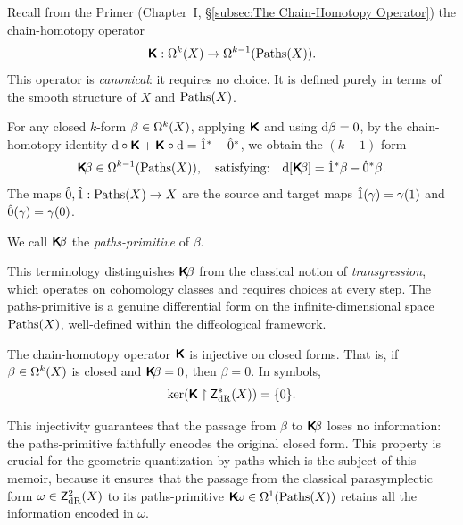 \documentclass[10pt,reqno,letterpaper,twoside]{amsbook}
\begin{document}
  \begin{article}
    \label{art:paths-primitives}
    Recall from the Primer (Chapter~I, \S\ref{subsec:The Chain-Homotopy Operator})
    the chain-homotopy operator
    \[
      \boldsymbol{\mathsf{K}}: \Omega^k(X) \to \Omega^{k-1}(\operatorname{Paths}(X)).
      \]%
    This operator is \emph{canonical}:
    it requires no choice.
    It is defined purely in terms of the smooth structure of $X$ and $\operatorname{Paths}(X)$.
    
    For any closed $k$-form $\beta \in \Omega^k(X)$,
    applying $\boldsymbol{\mathsf{K}}$ and using $\mathrm{d}\beta = 0$,
    by the chain-homotopy identity $\mathrm{d} \circ \boldsymbol{\mathsf{K}} + \boldsymbol{\mathsf{K}} \circ \mathrm{d} = \hat 1^* - \hat 0^*$,
    we obtain the $(k-1)$-form
    \[
      \boldsymbol{\mathsf{K}}\!\beta \in \Omega^{k-1}(\operatorname{Paths}(X)),
      \quad\text{satisfying:}\quad
      \mathrm{d}[\boldsymbol{\mathsf{K}}\!\beta] = \hat 1^*\beta - \hat 0^*\beta.
      \]%
    The maps $\hat 0, \hat 1: \operatorname{Paths}(X) \to X$ are the source and target maps
    $\hat 1(\gamma) = \gamma(1)$ and $\hat 0(\gamma) = \gamma(0)$.
    
    \begin{definition}
      We call $\boldsymbol{\mathsf{K}}\!\beta$ the \emph{paths-primitive} of $\beta$.
    \end{definition}
    
    This terminology distinguishes $\boldsymbol{\mathsf{K}}\!\beta$ from the classical notion of \emph{transgression},
    which operates on cohomology classes and requires choices at every step.
    The paths-primitive is a genuine differential form on the infinite-dimensional space $\operatorname{Paths}(X)$,
    well-defined within the diffeological framework.
    
    \begin{proposition}
      The chain-homotopy operator $\boldsymbol{\mathsf{K}}$ is injective on closed forms.
      That is,
      if $\beta \in \Omega^k(X)$ is closed and $\boldsymbol{\mathsf{K}}\!\beta = 0$,
      then $\beta = 0$.
      In symbols,
      \[
        \ker(\boldsymbol{\mathsf{K}} \restriction \mathsf{Z}_\mathrm{dR}^*(X)) = \{0\}.
        \]%
    \end{proposition}
    
    This injectivity guarantees that the passage from $\beta$ to $\boldsymbol{\mathsf{K}}\!\beta$ loses no information:
    the paths-primitive faithfully encodes the original closed form.
    This property is crucial for the geometric quantization by paths which is the subject of this memoir,
    because it ensures that the passage from the classical parasymplectic form $\omega \in \mathsf{Z}_\mathrm{dR}^2(X)$
    to its paths-primitive $\boldsymbol{\mathsf{K}}\!\omega \in \Omega^1(\operatorname{Paths}(X))$
    retains all the information encoded in $\omega$.
  \end{article}
  
\end{document}
